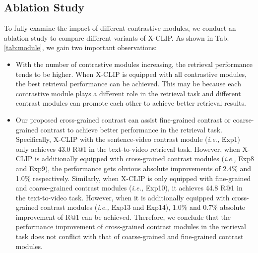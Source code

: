\documentclass[sigconf]{acmart}
\begin{document}
\subsection{Ablation Study}


To fully examine the impact of different contrastive modules, we conduct an ablation study to compare different variants of X-CLIP. As shown in Tab. \ref{tab:module}, we gain two important observations:
\begin{itemize}[leftmargin=*]
    \item With the number of contrastive modules increasing, the retrieval performance tends to be higher. When X-CLIP is equipped with all contrastive modules, the best retrieval performance can be achieved. This may be because each contrastive module plays a different role in the retrieval task and different contrast modules can promote each other to achieve better retrieval results.
    
    \item  Our proposed cross-grained contrast can assist fine-grained contrast or coarse-grained contrast to achieve better performance in the retrieval task. Specifically, X-CLIP with the sentence-video contrast module (\emph{i.e.,}  Exp1) only achieves 43.0 R@1 in the text-to-video retrieval task. However, when X-CLIP is additionally equipped with cross-grained contrast modules (\emph{i.e.,}  Exp8 and Exp9), the performance gets obvious absolute improvements of 2.4\% and 1.0\% respectively. Similarly, when X-CLIP is only equipped with fine-grained and coarse-grained contrast modules (\emph{i.e.,}  Exp10), it achieves 44.8 R@1 in the text-to-video task. However, when it is additionally equipped with cross-grained contrast modules (\emph{i.e.,}  Exp13 and Exp14), 1.0\% and 0.7\% absolute improvement of R@1 can be achieved. Therefore, we conclude that the performance improvement of cross-grained contrast modules in the retrieval task does not conflict with that of coarse-grained and fine-grained contrast modules.

\end{itemize}
\end{document}
